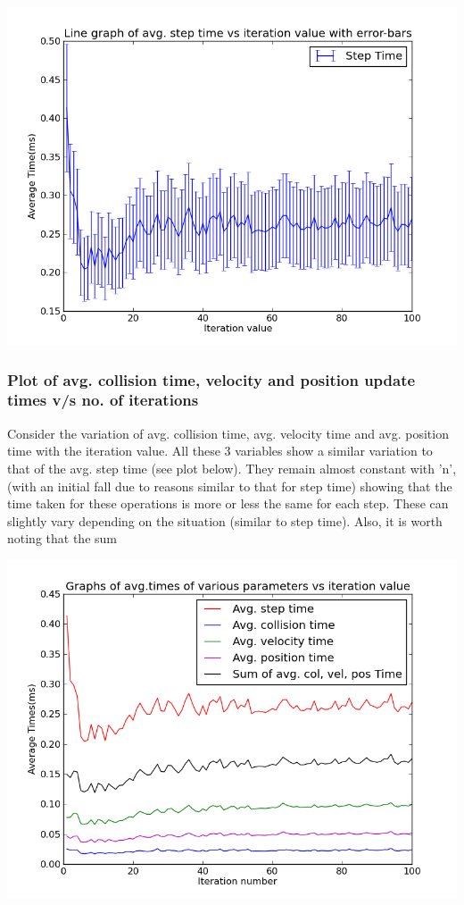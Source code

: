 \documentclass[11pt]{article}
\begin{document}
\begin{center} 
\includegraphics [scale=0.45]{./images/g29_plot03} 
\end{center}

\subsubsection{Plot of avg. collision time, velocity and position update times v/s no. of iterations}
Consider the variation of avg. collision time, avg. velocity time and avg. position time with the iteration value. All these 3 variables show a similar variation to that of the avg. step time (see plot below). They remain almost constant with 'n', (with an initial fall due to reasons similar to that for step time) showing that the time taken for these operations is more or less the same for each step. These can slightly vary depending on the situation (similar to step time). Also, it is worth noting that the sum

\begin{center} 
\includegraphics [scale=0.45]{./images/g29_plot02} 
\end{center}
\end{document}
